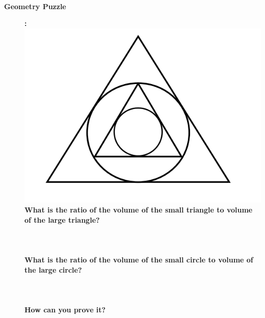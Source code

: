 \documentclass[11pt]{article}
\begin{document}
\begin{description}
\underline{\hspace{140mm}}\\\\
\underline{\hspace{140mm}}\\\\			
\underline{\hspace{140mm}}\\\\
\underline{\hspace{140mm}}\\\\	 

\newpage
\item [\textbf{ \large Geometry Puzzle}] \textbf{ \Large :}\\
\includegraphics[scale=0.7]{images/triangle_puzzle.png}	\\
%
\Large {\bf What is the ratio of the volume of the small triangle to volume of the large triangle?}\\\\\\\\
\Large {\bf What is the ratio of the volume of the small circle to volume of the large circle?}\\\\\\\\
\Large {\bf How can you prove it?}
\end{description}
 
\end{document}
